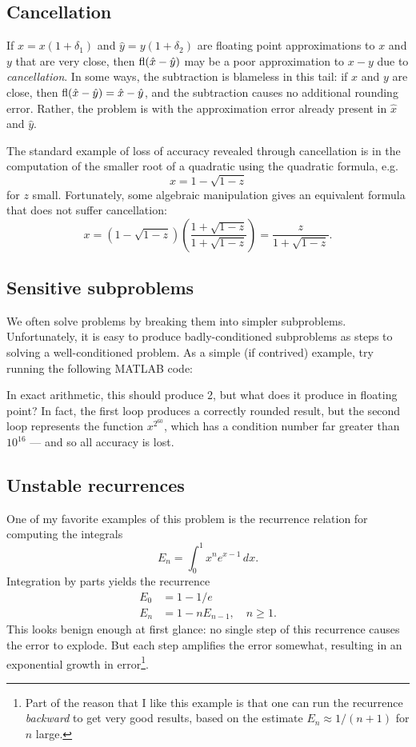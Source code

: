 \documentclass[12pt, leqno]{article} %
\begin{document}
\subsection{Cancellation}

If $\hat{x} = x(1+\delta_1)$ and $\hat{y} = y(1+\delta_2)$ are
floating point approximations to $x$ and $y$ that are very close, then
$\operatorname{fl}(\hat{x}-\hat{y})$ may be a poor approximation to $x-y$ due to
{\em cancellation}.  In some ways, the subtraction is blameless in
this tail: if $x$ and $y$ are close, then $\operatorname{fl}(\hat{x}-\hat{y}) =
\hat{x}-\hat{y}$, and the subtraction causes no additional rounding
error.  Rather, the problem is with the approximation error already
present in $\hat{x}$ and $\hat{y}$.

The standard example of loss of accuracy revealed through cancellation
is in the computation of the smaller root of a quadratic using the
quadratic formula, e.g.
\[
  x = 1-\sqrt{1-z}
\]
for $z$ small.  Fortunately, some algebraic manipulation gives an
equivalent formula that does not suffer cancellation:
\[
  x =
    \left( 1-\sqrt{1-z} \right)
    \left(\frac{1+\sqrt{1-z}}{1+\sqrt{1-z}}\right)
  =
    \frac{z}{1+\sqrt{1-z}}.
\]

\subsection{Sensitive subproblems}

We often solve problems by breaking them into simpler subproblems.
Unfortunately, it is easy to produce badly-conditioned subproblems
as steps to solving a well-conditioned problem.  As a simple (if
contrived) example, try running the following MATLAB code:



In exact arithmetic, this should produce 2, but what does it produce
in floating point?  In fact, the first loop produces a correctly
rounded result, but the second loop represents the function
$x^{2^{60}}$, which has a condition number far greater than $10^{16}$
--- and so all accuracy is lost.

\subsection{Unstable recurrences}

One of my favorite examples of this problem is the recurrence relation
for computing the integrals
\[
  E_n = \int_{0}^1 x^n e^{x-1} \, dx.
\]
Integration by parts yields the recurrence
\begin{align*}
  E_0 &= 1-1/e \\
  E_n &= 1-nE_{n-1}, \quad n \geq 1.
\end{align*}
This looks benign enough at first glance: no single step of
this recurrence causes the error to explode.  But
each step amplifies the error somewhat, resulting in an exponential
growth in error\footnote{%
Part of the reason that I like this example is that one can
run the recurrence {\em backward} to get very good results,
based on the estimate $E_n \approx 1/(n+1)$ for $n$ large.
}.
\end{document}
